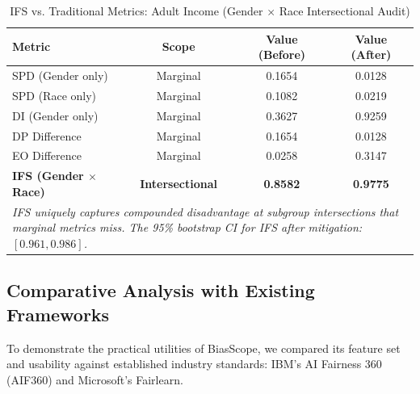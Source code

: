 \documentclass[conference]{IEEEtran}
\begin{document}
\begin{table}[htbp]
\caption{IFS vs. Traditional Metrics: Adult Income (Gender $\times$ Race Intersectional Audit)}
\label{tab:comparison_metrics}
\centering
\begin{tabular}{@{}lccc@{}}
\toprule
\textbf{Metric} & \textbf{Scope} & \textbf{Value (Before)} & \textbf{Value (After)} \\ \midrule
SPD (Gender only)      & Marginal   & 0.1654 & 0.0128 \\
SPD (Race only)        & Marginal   & 0.1082 & 0.0219 \\
DI (Gender only)       & Marginal   & 0.3627 & 0.9259 \\
DP Difference          & Marginal   & 0.1654 & 0.0128 \\
EO Difference          & Marginal   & 0.0258 & 0.3147 \\
\textbf{IFS (Gender $\times$ Race)} & \textbf{Intersectional} & \textbf{0.8582} & \textbf{0.9775} \\ \bottomrule
\multicolumn{4}{p{0.9\linewidth}}{\footnotesize \textit{IFS uniquely captures compounded disadvantage at subgroup intersections that marginal metrics miss. The 95\% bootstrap CI for IFS after mitigation: $[0.961, 0.986]$.}}
\end{tabular}
\end{table}

\subsection{Comparative Analysis with Existing Frameworks}
To demonstrate the practical utilities of BiasScope, we compared its feature set and usability against established industry standards: IBM's AI Fairness 360 (AIF360) and Microsoft's Fairlearn.

\begin{table}[htbp]
\caption{Feature Comparison of Algorithmic Fairness Frameworks}
\label{tab:comparison}
\centering
{}
\end{table}
\end{document}
